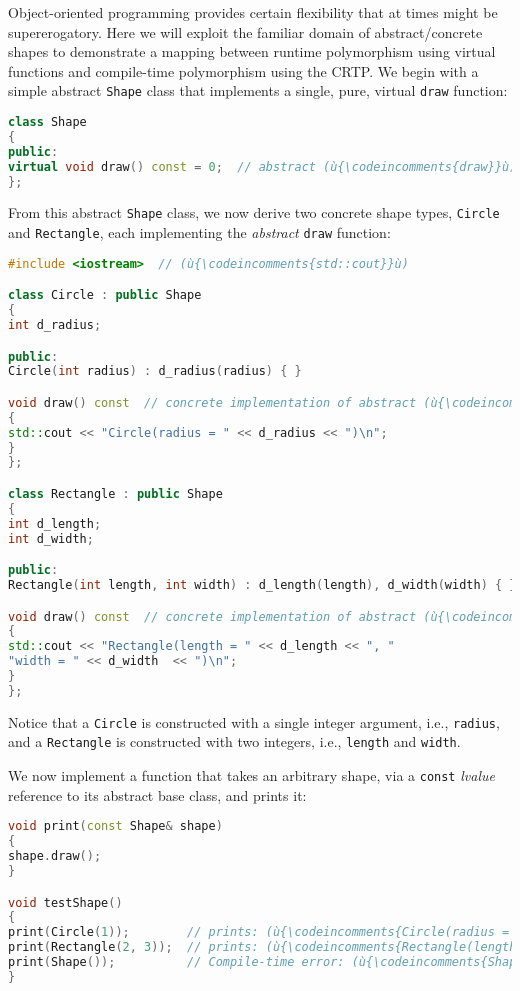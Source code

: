 Object-oriented programming provides certain flexibility that at times
might be supererogatory. Here we will exploit the familiar domain of
abstract/concrete shapes to demonstrate a mapping between runtime
polymorphism using virtual functions and compile-time polymorphism using
the CRTP. We begin with a simple abstract \texttt{Shape} class that
implements a single, pure, virtual \texttt{draw} function:

\begin{lstlisting}[language=C++]
class Shape
{
public:
virtual void draw() const = 0;  // abstract (ù{\codeincomments{draw}}ù) function (interface)
};
\end{lstlisting}

\noindent From this abstract \texttt{Shape} class, we now derive two concrete
shape types, \texttt{Circle} and \mbox{\texttt{Rectangle}}, each implementing
the \emph{abstract} \texttt{draw} function:

\begin{lstlisting}[language=C++]
#include <iostream>  // (ù{\codeincomments{std::cout}}ù)

class Circle : public Shape
{
int d_radius;

public:
Circle(int radius) : d_radius(radius) { }

void draw() const  // concrete implementation of abstract (ù{\codeincomments{draw}}ù) function
{
std::cout << "Circle(radius = " << d_radius << ")\n";
}
};

class Rectangle : public Shape
{
int d_length;
int d_width;

public:
Rectangle(int length, int width) : d_length(length), d_width(width) { }

void draw() const  // concrete implementation of abstract (ù{\codeincomments{draw}}ù) function
{
std::cout << "Rectangle(length = " << d_length << ", "
"width = " << d_width  << ")\n";
}
};
\end{lstlisting}

\noindent Notice that a \texttt{Circle} is constructed with a single integer
argument, i.e., \texttt{radius}, and a \texttt{Rectangle} is constructed
with two integers, i.e., \texttt{length} and \texttt{width}.

We now implement a function that takes an arbitrary shape, via a
\texttt{const} \emph{lvalue} reference to its abstract base class, and
prints it:

\begin{lstlisting}[language=C++]
void print(const Shape& shape)
{
shape.draw();
}

void testShape()
{
print(Circle(1));        // prints: (ù{\codeincomments{Circle(radius = 1)}}ù)
print(Rectangle(2, 3));  // prints: (ù{\codeincomments{Rectangle(length = 2, width = 3)}}ù)
print(Shape());          // Compile-time error: (ù{\codeincomments{Shape}}ù) is an abstract class.
}
\end{lstlisting}

